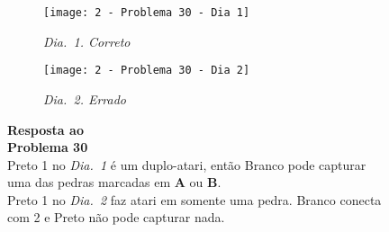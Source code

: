 \pagebreak

\begin{SCfigure}[][h!]
    \begin{subfigure}[t]{.31\textwidth}
        \texttt{[image: 2 - Problema 30 - Dia 1]}
        \captionsetup{justification=centering}
        \caption*{\emph{Dia.\@~1. Correto}}
    \end{subfigure}
    \hfill
    \begin{subfigure}[t]{.31\textwidth}
        \texttt{[image: 2 - Problema 30 - Dia 2]}
        \captionsetup{justification=centering}
        \caption*{\emph{Dia.\@~2. Errado}}
    \end{subfigure}
    \hfill
    \caption*{\textbf{Resposta ao\\Problema 30}\\\vspace*{.25cm}Preto 1 no \emph{Dia.\@~1} é um duplo-atari, então Branco pode capturar uma das pedras marcadas em \textbf{A} ou \textbf{B}.\\\vspace*{.25cm}Preto 1 no \emph{Dia.\@~2} faz atari em somente uma pedra. Branco conecta com 2 e Preto não pode capturar nada.}
\end{SCfigure}